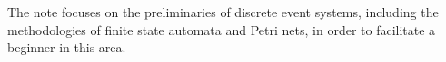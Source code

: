 
%
%
%


\begin{dedication}
The note focuses on the preliminaries of discrete event systems, including the methodologies of finite state automata and Petri nets, in order to facilitate a beginner in this area.
\end{dedication}




